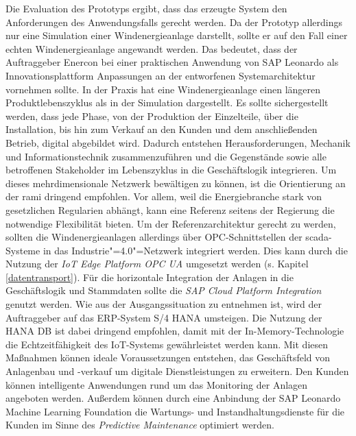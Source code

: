Die Evaluation des Prototyps ergibt, dass das erzeugte System den Anforderungen des Anwendungsfalls gerecht werden. Da der Prototyp allerdings nur eine Simulation einer Windenergieanlage darstellt, sollte er auf den Fall einer echten Windenergieanlage angewandt werden. Das bedeutet, dass der Auftraggeber Enercon bei einer praktischen Anwendung von SAP Leonardo als Innovationsplattform Anpassungen an der entworfenen Systemarchitektur vornehmen sollte. In der Praxis hat eine Windenergieanlage einen längeren Produktlebenszyklus als in der Simulation dargestellt. Es sollte sichergestellt werden, dass jede Phase, von der Produktion der Einzelteile, über die Installation, bis hin zum Verkauf an den Kunden und dem anschließenden Betrieb, digital abgebildet wird. Dadurch entstehen Herausforderungen, Mechanik und Informationstechnik zusammenzuführen und die Gegenstände sowie alle betroffenen Stakeholder im Lebenszyklus in die Geschäftslogik integrieren. Um dieses mehrdimensionale Netzwerk bewältigen zu können, ist die Orientierung an der \ac{rami} dringend empfohlen. Vor allem, weil die Energiebranche stark von gesetzlichen Regularien abhängt, kann eine Referenz seitens der Regierung die notwendige Flexibilität bieten. Um der Referenzarchitektur gerecht zu werden, sollten die Windenergieanlagen allerdings über OPC-Schnittstellen der \ac{scada}-Systeme in das Industrie"=4.0"=Netzwerk integriert werden. Dies kann durch die Nutzung der \textit{IoT Edge Platform OPC UA} umgesetzt werden (s. Kapitel \ref{datentransport}). Für die horizontale Integration der Anlagen in die Geschäftslogik und Stammdaten sollte die \textit{SAP Cloud Platform Integration} genutzt werden. Wie aus der Ausgangssituation zu entnehmen ist, wird der Auftraggeber auf das ERP-System S/4 HANA umsteigen. Die Nutzung der HANA DB ist dabei dringend empfohlen, damit mit der In-Memory-Technologie die Echtzeitfähigkeit des IoT-Systems gewährleistet werden kann. Mit diesen Maßnahmen können ideale Voraussetzungen entstehen, das Geschäftsfeld von Anlagenbau und -verkauf um digitale Dienstleistungen zu erweitern. Den Kunden können intelligente Anwendungen rund um das Monitoring der Anlagen angeboten werden. Außerdem können durch eine Anbindung der SAP Leonardo Machine Learning Foundation die Wartungs- und Instandhaltungsdienste für die Kunden im Sinne des \textit{Predictive Maintenance} optimiert werden. 
 

\newpage
